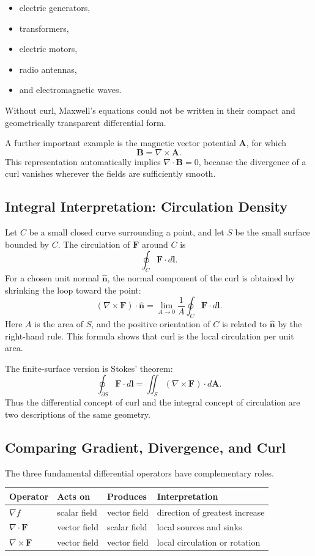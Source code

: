 \begin{itemize}
  \item electric generators,
  \item transformers,
  \item electric motors,
  \item radio antennas,
  \item and electromagnetic waves.
\end{itemize}

Without curl, Maxwell's equations could not be written in their compact and
geometrically transparent differential form.

A further important example is the magnetic vector potential $\mathbf A$, for
which
\[
\boxed{
\mathbf B=\nabla\times\mathbf A.
}
\]
This representation automatically implies $\nabla\cdot\mathbf B=0$, because
the divergence of a curl vanishes wherever the fields are sufficiently smooth.

\subsection{Integral Interpretation: Circulation Density}

Let $C$ be a small closed curve surrounding a point, and let $S$ be the small
surface bounded by $C$. The circulation of $\mathbf F$ around $C$ is
\[
\oint_C \mathbf F\cdot d\mathbf l.
\]
For a chosen unit normal $\hat{\mathbf n}$, the normal component of the curl is
obtained by shrinking the loop toward the point:
\[
\boxed{
(\nabla\times\mathbf F)\cdot\hat{\mathbf n}
=
\lim_{A\to0}
\frac{1}{A}
\oint_C \mathbf F\cdot d\mathbf l.
}
\]
Here $A$ is the area of $S$, and the positive orientation of $C$ is related to
$\hat{\mathbf n}$ by the right-hand rule. This formula shows that curl is the
local circulation per unit area.

The finite-surface version is Stokes' theorem:
\[
\boxed{
\oint_{\partial S}\mathbf F\cdot d\mathbf l
=
\iint_S(\nabla\times\mathbf F)\cdot d\mathbf A.
}
\]
Thus the differential concept of curl and the integral concept of circulation
are two descriptions of the same geometry.

\subsection{Comparing Gradient, Divergence, and Curl}

The three fundamental differential operators have complementary roles.

\begin{center}
\renewcommand{\arraystretch}{1.35}
\begin{tabular}{llll}
\textbf{Operator} & \textbf{Acts on} & \textbf{Produces} & \textbf{Interpretation}\\
\hline
$\nabla f$ & scalar field & vector field & direction of greatest increase\\
$\nabla\cdot\mathbf F$ & vector field & scalar field & local sources and sinks\\
$\nabla\times\mathbf F$ & vector field & vector field & local circulation or rotation
\end{tabular}
\end{center}

